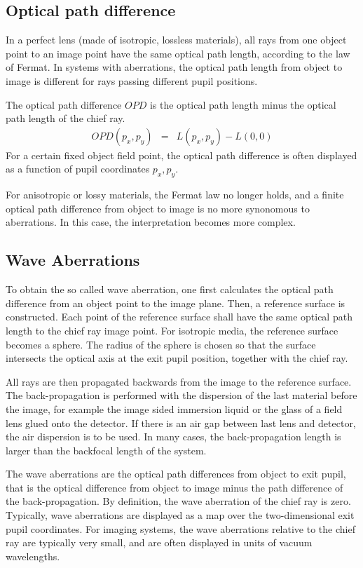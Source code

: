 \documentclass[12pt,a4paper,twoside,openright,BCOR10mm,headsepline,titlepage,abstracton,chapterprefix,final]{scrreprt}
\begin{document}
\subsection{Optical path difference}
In a perfect lens (made of isotropic, lossless materials), all rays from one object point to an image point have the same optical path length, according to the law of Fermat. 
In systems with aberrations, the optical path length from object to image is different for rays passing different pupil positions.

The optical path difference $OPD$ is the optical path length minus the optical path length of the chief ray.
\begin{eqnarray}
 OPD(p_x,p_y) &=& L(p_x,p_y) - L(0,0)
\end{eqnarray}
For a certain fixed object field point, the optical path difference is often displayed as a function of pupil coordinates $p_x,p_y$.

For anisotropic or lossy materials, the Fermat law no longer holds, and a finite optical path difference from object to image is no more synonomous to aberrations.
In this case, the interpretation becomes more complex.

\subsection{Wave Aberrations}
To obtain the so called wave aberration, one first calculates the optical path difference from an object point to the image plane.
Then, a reference surface is constructed. 
Each point of the reference surface shall have the same optical path length to the chief ray image point.
For isotropic media, the reference surface becomes a sphere.
The radius of the sphere is chosen so that the surface intersects the optical axis at the exit pupil position, together with the chief ray.

All rays are then propagated backwards from the image to the reference surface.
The back-propagation is performed with the dispersion of the last material before the image, 
for example the image sided immersion liquid or the glass of a field lens glued onto the detector.
If there is an air gap between last lens and detector, the air dispersion is to be used.
In many cases, the back-propagation length is larger than the backfocal length of the system.

The wave aberrations are the optical path differences from object to exit pupil, 
that is the optical difference from object to image minus the path difference of the back-propagation.
By definition, the wave aberration of the chief ray is zero.
Typically, wave aberrations are displayed as a map over the two-dimensional exit pupil coordinates.
For imaging systems, the wave aberrations relative to the chief ray are typically very small, and are often displayed in units of vacuum wavelengths.
\end{document}
